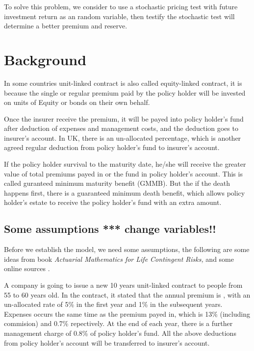 \documentclass{report}
\begin{document}
To solve this problem, we consider to use a stochastic pricing test with future investment return as an random variable, then testify the stochastic test will determine a better premium and reserve. 


\section{Background}

In some countries unit-linked contract is also called equity-linked contract, it is because the single or regular premium paid by the policy holder will be invested on units of Equity or bonds on their own behalf.


Once the insurer receive the premium, it will be payed into policy holder's fund after deduction of expenses and management costs, and the deduction goes to insurer's account. In UK, there is an un-allocated percentage, which is another agreed regular deduction from policy holder's fund to insurer's account.

 \cite{bib:GMMB}If the policy holder survival to the maturity date, he/she will receive the greater value of total premiums payed in or the fund in policy holder's account. This is called guranteed minimum maturity benefit (GMMB). But the if the death happens first, there is a guaranteed minimum death benefit, which allows policy holder's estate to receive the policy holder's fund with an extra amount. 


\subsection{Some assumptions *** change variables!!} 

Before we establish the model, we need some assumptions, the following are some ideas from  \cite{bib:unitlinkeg} book {\em Actuarial Mathematics for Life Contingent Risks,} and some online sources \cite{bib:unitlinkegonline}. 


A company is going to issue a new 10 years unit-linked contract to people from 55 to 60 years old. In the contract, it stated that the annual premium is , with an un-allocated rate of 5\% in the first year and 1\% in the subsequent years. Expenses occurs the same time as the premium payed in, which is 13\% (including commision) and 0.7\% repectively. At the end of each year, there is a further management charge of 0.8\% of policy holder's fund. All the above deductions from policy holder's account will be transferred to insurer's account.
\end{document}
